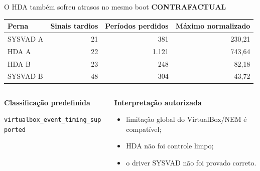 \documentclass[aspectratio=169,10pt]{beamer}
\newcommand{\kicker}[1]{%
    {\color{signalorange}\scriptsize\bfseries\MakeUppercase{#1}}\par\vspace{0.08cm}
}
\begin{document}
\begin{frame}{O HDA também sofreu atrasos no mesmo boot}
    \kicker{Contrafactual}
    \small
    \begin{tabularx}{\textwidth}{@{}Yrrr@{}}
        \toprule
        \textbf{Perna} & \textbf{Sinais tardios} &
        \textbf{Períodos perdidos} & \textbf{Máximo normalizado} \\
        \midrule
        SYSVAD A & 21 & 381 & 230,21 \\
        HDA A & 22 & 1.121 & 743,64 \\
        HDA B & 23 & 248 & 82,18 \\
        SYSVAD B & 48 & 304 & 43,72 \\
        \bottomrule
    \end{tabularx}

    \vspace{0.35cm}
    \begin{columns}[T,onlytextwidth]
        \begin{column}{0.49\textwidth}
            \textbf{Classificação predefinida}

            \texttt{virtualbox\_event\_timing\_supported}
        \end{column}
        \begin{column}{0.49\textwidth}
            \textbf{Interpretação autorizada}
            \begin{itemize}
                \item limitação global do VirtualBox/NEM é compatível;
                \item HDA não foi controle limpo;
                \item o driver SYSVAD não foi provado correto.
            \end{itemize}
        \end{column}
    \end{columns}
\end{frame}
\end{document}
